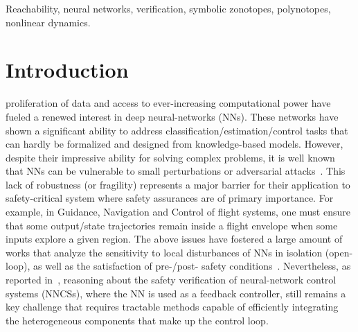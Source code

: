 \documentclass[journal]{IEEEtran}
\begin{document}
\begin{IEEEkeywords}
Reachability, neural networks, verification, symbolic zonotopes, polynotopes, nonlinear dynamics.
\end{IEEEkeywords}

\IEEEpeerreviewmaketitle



\section{Introduction} \label{sec:introduction}

 proliferation of data and access to ever-increasing computational power have fueled a renewed interest in deep neural-networks (NNs). These networks have shown a significant ability to address classification/estimation/control tasks that can hardly be formalized and designed from knowledge-based models. However, despite their impressive ability for solving complex problems, it is well known that NNs can be vulnerable to small perturbations or adversarial attacks~\cite{szegedy2013intriguing,kurakin2018adversarial}. This lack of robustness (or fragility) represents a major barrier for their application to safety-critical system where safety assurances are of primary importance. For example, in Guidance, Navigation and Control of flight systems, one must ensure that some output/state trajectories remain inside a flight envelope when some inputs explore a given region. The above issues have fostered a large amount of works that analyze the sensitivity  to  local disturbances of NNs in isolation (open-loop), as well as the satisfaction of pre-/post- safety conditions~\cite{liu2021algorithms}.  Nevertheless, as reported in~\cite{johnson2021arch}, reasoning about the safety verification of neural-network control systems (NNCSs), where the NN is used as a feedback controller, still remains a key challenge that requires tractable methods  capable of efficiently integrating the heterogeneous components that make up the control loop.
\end{document}
